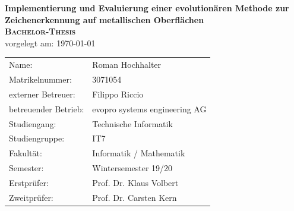 \documentclass[10pt,a4paper,abstraction]{scrreprt}
\begin{document}
\begin{titlepage}
		\begin{center}
			\huge \textbf{\textsf{Implementierung und Evaluierung einer evolutionären Methode zur Zeichenerkennung auf metallischen Oberflächen}} \\
			\vspace{5cm}
			\huge\textbf{\textsc{Bachelor-Thesis}} \\
			\vspace{1cm}
			\normalsize{vorgelegt am: \today} \\
			\vspace{2.5cm}
			\vspace{3cm}
			\normalsize{
				\begin{tabular}{ll}
					Name: & {Roman Hochhalter} \\
					Matrikelnummer: & {3071054} \\
					externer Betreuer: & Filippo Riccio \\
					betreuender Betrieb: & evopro systems engineering AG \\
					Studiengang: & Technische Informatik \\
					Studiengruppe: & IT7 \\
					Fakultät: & Informatik / Mathematik \\
					Semester: & Wintersemester 19/20 \\
					Erstprüfer: & {Prof. Dr. Klaus Volbert} \\
					Zweitprüfer: & {Prof. Dr. Carsten Kern} \\
				\end{tabular}
			}
		\end{center}
	\end{titlepage}
\end{document}
